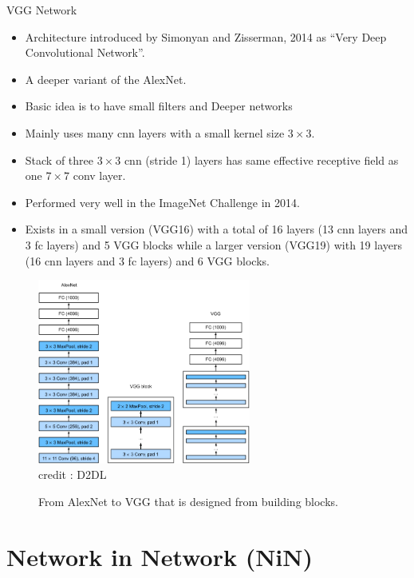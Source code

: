 \begin{vbframe}{VGG Network}
  \begin{itemize}
    \item Architecture introduced by Simonyan and Zisserman, 2014 as \enquote{Very Deep Convolutional Network}.
    \item A deeper variant of the AlexNet.
    \item Basic idea is to have small filters and Deeper networks
    \item Mainly uses many cnn layers with a small kernel size $3 \times 3$.
    \item Stack of three $3 \times 3$ cnn (stride 1) layers has same effective receptive field as one $7 \times 7$ conv layer.
    \item Performed very well in the ImageNet Challenge in 2014.
    \item Exists in a small version (VGG16) with a total of 16 layers (13 cnn layers and 3 fc layers) and 5 VGG blocks while a larger version (VGG19) with 19 layers (16 cnn layers and 3 fc layers) and 6 VGG blocks.
  \end{itemize}
\framebreak
  \begin{figure}
  \centering
    \includegraphics[width=7cm]{plots/moderncnn/vgg.png}
    \tiny{\\ credit : D2DL}
    \caption{From AlexNet to VGG that is designed from building blocks.}
  \end{figure}

\end{vbframe}

\section{Network in Network (NiN)}


